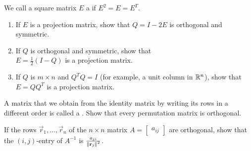 \documentclass{ximera}
\begin{document}
\begin{problem}\label{prob:ortho20}
We call a square matrix $E$ a  if $E^{2} = E = E^{T}$.


\begin{enumerate} 
\item If $E$ is a projection matrix, show that $Q = I - 2E$ is orthogonal and symmetric.

\item If $Q$ is orthogonal and symmetric, show that \\ $E = \frac{1}{2}(I - Q)$ is a projection matrix.

\item If $Q$ is $m \times n$ and $Q^{T}Q = I$ (for example, a unit column in $\mathbb{R}^n$), show that $E = QQ^{T}$ is a projection matrix.

\end{enumerate}
\end{problem}

\begin{problem}\label{prob:ortho21}
A matrix that we obtain from the identity matrix by writing its rows in a different order is called a . Show that every permutation matrix is orthogonal.
\end{problem}

\begin{problem}\label{prob:ortho22}
If the rows $\vec{r}_{1}, \dots, \vec{r}_{n}$ of the $n \times n$ matrix $A = \begin{bmatrix}
a_{ij}
\end{bmatrix}$ are orthogonal, show that the $(i, j)$-entry of $A^{-1}$ is $\frac{a_{ji}}{\left\lVert\mathbf{r}_{j}\right\rVert^2}$.

\end{problem}
\end{document}
